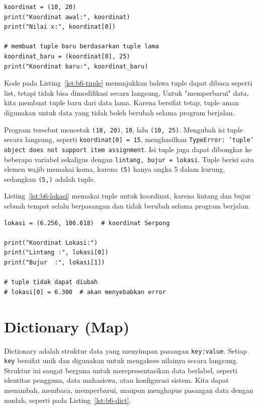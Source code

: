 \begin{lstlisting}[style=PythonStyle, caption={Membaca tuple dan membuat tuple baru}, label={lst:b6-tuple}]
koordinat = (10, 20)
print("Koordinat awal:", koordinat)
print("Nilai x:", koordinat[0])

# membuat tuple baru berdasarkan tuple lama
koordinat_baru = (koordinat[0], 25)
print("Koordinat baru:", koordinat_baru)
\end{lstlisting}

Kode pada Listing~\ref{lst:b6-tuple} menunjukkan bahwa tuple dapat dibaca seperti list, 
tetapi tidak bisa dimodifikasi secara langsung. 
Untuk "memperbarui" data, kita membuat tuple baru dari data lama. 
Karena bersifat tetap, tuple aman digunakan untuk data yang tidak boleh berubah selama program berjalan.

Program tersebut mencetak \texttt{(10, 20)}, \texttt{10}, lalu \texttt{(10, 25)}. Mengubah isi tuple secara langsung, seperti \texttt{koordinat[0] = 15}, menghasilkan \texttt{TypeError: 'tuple' object does not support item assignment}. Isi tuple juga dapat dibongkar ke beberapa variabel sekaligus dengan \texttt{lintang, bujur = lokasi}. Tuple berisi satu elemen wajib memakai koma, karena \texttt{(5)} hanya angka 5 dalam kurung, sedangkan \texttt{(5,)} adalah tuple.

Listing~\ref{lst:b6-lokasi} memakai tuple untuk koordinat, karena lintang dan bujur sebuah tempat selalu berpasangan dan tidak berubah selama program berjalan.


\begin{lstlisting}[style=PythonStyle, caption={Koordinat lokasi disimpan sebagai tuple}, label={lst:b6-lokasi}]
lokasi = (6.256, 106.618)  # koordinat Serpong

print("Koordinat Lokasi:")
print("Lintang :", lokasi[0])
print("Bujur  :", lokasi[1])

# tuple tidak dapat diubah
# lokasi[0] = 6.300  # akan menyebabkan error
\end{lstlisting}

\section{Dictionary (Map)}
Dictionary adalah struktur data yang menyimpan pasangan \texttt{key:value}. 
Setiap \texttt{key} bersifat unik dan digunakan untuk mengakses nilainya secara langsung. 
Struktur ini sangat berguna untuk merepresentasikan data berlabel, seperti identitas pengguna, data mahasiswa, atau konfigurasi sistem. 
Kita dapat menambah, membaca, memperbarui, maupun menghapus pasangan data dengan mudah, seperti pada Listing~\ref{lst:b6-dict}.

